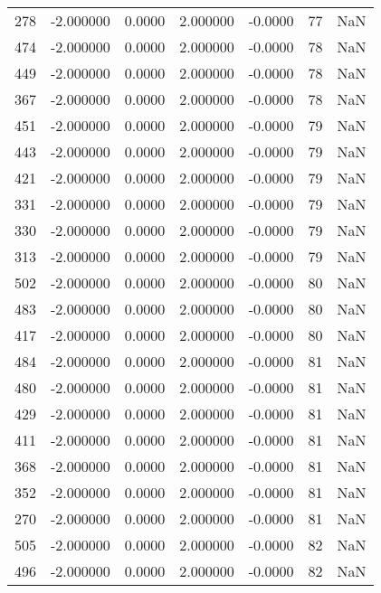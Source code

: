 \begin{tabular}{rrrrrrr}
278 &   -2.000000 &    0.0000 &    2.000000 &     -0.0000 &          77 & NaN \\
474 &   -2.000000 &    0.0000 &    2.000000 &     -0.0000 &          78 & NaN \\
449 &   -2.000000 &    0.0000 &    2.000000 &     -0.0000 &          78 & NaN \\
367 &   -2.000000 &    0.0000 &    2.000000 &     -0.0000 &          78 & NaN \\
451 &   -2.000000 &    0.0000 &    2.000000 &     -0.0000 &          79 & NaN \\
443 &   -2.000000 &    0.0000 &    2.000000 &     -0.0000 &          79 & NaN \\
421 &   -2.000000 &    0.0000 &    2.000000 &     -0.0000 &          79 & NaN \\
331 &   -2.000000 &    0.0000 &    2.000000 &     -0.0000 &          79 & NaN \\
330 &   -2.000000 &    0.0000 &    2.000000 &     -0.0000 &          79 & NaN \\
313 &   -2.000000 &    0.0000 &    2.000000 &     -0.0000 &          79 & NaN \\
502 &   -2.000000 &    0.0000 &    2.000000 &     -0.0000 &          80 & NaN \\
483 &   -2.000000 &    0.0000 &    2.000000 &     -0.0000 &          80 & NaN \\
417 &   -2.000000 &    0.0000 &    2.000000 &     -0.0000 &          80 & NaN \\
484 &   -2.000000 &    0.0000 &    2.000000 &     -0.0000 &          81 & NaN \\
480 &   -2.000000 &    0.0000 &    2.000000 &     -0.0000 &          81 & NaN \\
429 &   -2.000000 &    0.0000 &    2.000000 &     -0.0000 &          81 & NaN \\
411 &   -2.000000 &    0.0000 &    2.000000 &     -0.0000 &          81 & NaN \\
368 &   -2.000000 &    0.0000 &    2.000000 &     -0.0000 &          81 & NaN \\
352 &   -2.000000 &    0.0000 &    2.000000 &     -0.0000 &          81 & NaN \\
270 &   -2.000000 &    0.0000 &    2.000000 &     -0.0000 &          81 & NaN \\
505 &   -2.000000 &    0.0000 &    2.000000 &     -0.0000 &          82 & NaN \\
496 &   -2.000000 &    0.0000 &    2.000000 &     -0.0000 &          82 & NaN \\

\end{tabular}
